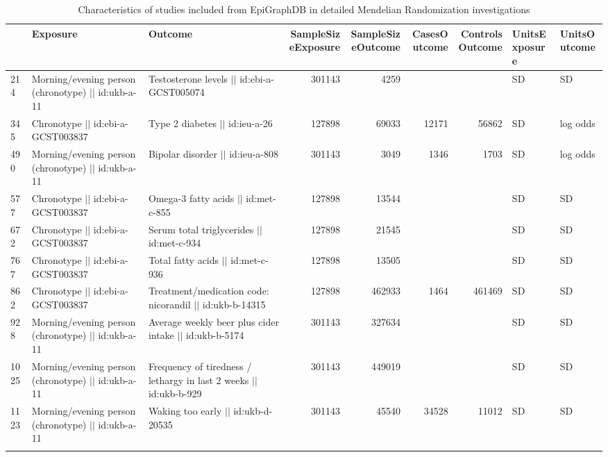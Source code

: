 \begin{longtable}{lllrrrrll}
  \hline
 & Exposure & Outcome & SampleSizeExposure & SampleSizeOutcome & CasesOutcome & ControlsOutcome & UnitsExposure & UnitsOutcome \\ 
  \hline
214 & Morning/evening person (chronotype) $|$$|$ id:ukb-a-11 & Testosterone levels $|$$|$ id:ebi-a-GCST005074 & 301143 & 4259 &  &  & SD & SD \\ 
  345 & Chronotype $|$$|$ id:ebi-a-GCST003837 & Type 2 diabetes $|$$|$ id:ieu-a-26 & 127898 & 69033 & 12171 & 56862 & SD & log odds \\ 
  490 & Morning/evening person (chronotype) $|$$|$ id:ukb-a-11 & Bipolar disorder $|$$|$ id:ieu-a-808 & 301143 & 3049 & 1346 & 1703 & SD & log odds \\ 
  577 & Chronotype $|$$|$ id:ebi-a-GCST003837 & Omega-3 fatty acids $|$$|$ id:met-c-855 & 127898 & 13544 &  &  & SD & SD \\ 
  672 & Chronotype $|$$|$ id:ebi-a-GCST003837 & Serum total triglycerides $|$$|$ id:met-c-934 & 127898 & 21545 &  &  & SD & SD \\ 
  767 & Chronotype $|$$|$ id:ebi-a-GCST003837 & Total fatty acids $|$$|$ id:met-c-936 & 127898 & 13505 &  &  & SD & SD \\ 
  862 & Chronotype $|$$|$ id:ebi-a-GCST003837 & Treatment/medication code: nicorandil $|$$|$ id:ukb-b-14315 & 127898 & 462933 & 1464 & 461469 & SD & SD \\ 
  928 & Morning/evening person (chronotype) $|$$|$ id:ukb-a-11 & Average weekly beer plus cider intake $|$$|$ id:ukb-b-5174 & 301143 & 327634 &  &  & SD & SD \\ 
  1025 & Morning/evening person (chronotype) $|$$|$ id:ukb-a-11 & Frequency of tiredness / lethargy in last 2 weeks $|$$|$ id:ukb-b-929 & 301143 & 449019 &  &  & SD & SD \\ 
  1123 & Morning/evening person (chronotype) $|$$|$ id:ukb-a-11 & Waking too early $|$$|$ id:ukb-d-20535 & 301143 & 45540 & 34528 & 11012 & SD & SD \\ 
   \hline
\hline
\caption{Characteristics of studies included from EpiGraphDB in detailed Mendelian Randomization investigations} 
\label{studyChars}
\end{longtable}
